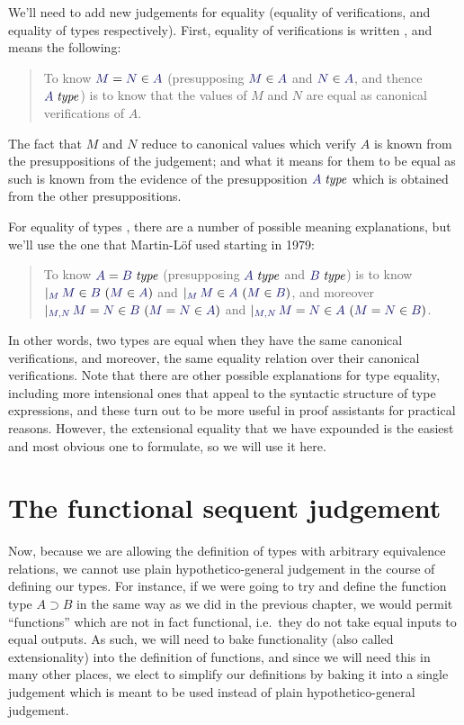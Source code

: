 \documentclass[main.tex]{subfiles}
\begin{document}
We'll need to add new judgements for equality (equality of
verifications, and equality of types respectively). First, equality of
verifications is written , and means the
following:

\begin{quote}
  To know $\ever{M}{N}{A}$ (presupposing $\ver{M}{A}$ and $\ver{N}{A}$,
  and thence $\isset{A}$) is to know that the values of $M$ and $N$ are
  equal as canonical verifications of $A$.
\end{quote}

The fact that $M$ and $N$ reduce to canonical values which verify $A$
is known from the presuppositions of the judgement; and what it means
for them to be equal as such is known from the evidence of the
presupposition $\isset{A}$ which is obtained from the other
presuppositions.

For equality of types , there are a number of
possible meaning explanations, but we'll use the one that Martin-L\"of
used starting in 1979:

\begin{quote}
  To know $\eisset{A}{B}$ (presupposing $\isset{A}$ and $\isset{B}$) is to know
$\genj{M}{\hyp{\ver{M}{B}}{\ver{M}{A}}}$ and
$\genj{M}{\hyp{\ver{M}{A}}{\ver{M}{B}}}$, and moreover
$\genj{M,N}{\hyp{\ever{M}{N}{B}}{\ever{M}{N}{A}}}$ and
$\genj{M,N}{\hyp{\ever{M}{N}{A}}{\ever{M}{N}{B}}}$.
\end{quote}

In other words, two types are equal when they have the same canonical
verifications, and moreover, the same equality relation over their canonical
verifications. Note that there are other possible explanations for type
equality, including more intensional ones that appeal to the syntactic
structure of type expressions, and these turn out to be more useful in proof
assistants for practical reasons. However, the extensional equality that we
have expounded is the easiest and most obvious one to formulate, so we will
use it here.

\section{The functional sequent judgement}

Now, because we are allowing the definition of types with arbitrary equivalence
relations, we cannot use plain hypothetico-general judgement in the course of
defining our types. For instance, if we were going to try and define the
function type $A\supset B$ in the same way as we did in the previous chapter,
we would permit ``functions'' which are not in fact functional, i.e.\ they do
not take equal inputs to equal outputs. As such, we will need to bake
functionality (also called extensionality) into the definition of functions,
and since we will need this in many other places, we elect to simplify our
definitions by baking it into a single judgement which is meant to be used
instead of plain hypothetico-general judgement.
\end{document}
